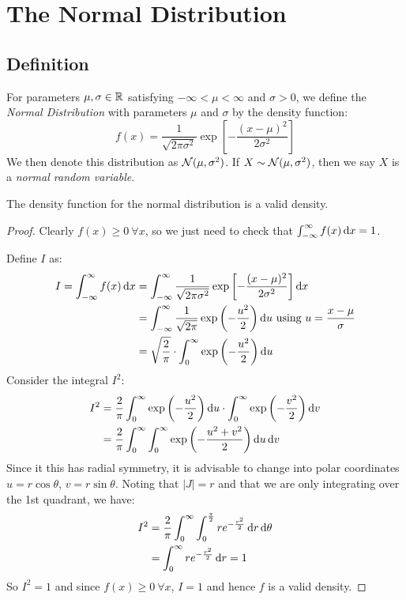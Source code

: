\documentclass[../main.tex]{subfiles}
\begin{document}
\section{The Normal Distribution}
\subsection{Definition}
\begin{definition}
  For parameters $\mu, \sigma \in \mathbb{R}$ satisfying $-\infty < \mu < \infty$ and $\sigma > 0$, we define the \textit{Normal Distribution} with parameters $\mu$ and $\sigma$ by the density function: \label{normalDist}
  \[
    f(x) = \frac{1}{\sqrt{2\pi \sigma^2}}\exp\left[- \frac{(x - \mu)^2}{2 \sigma^2}\right]
  \]
  We then denote this distribution as $\operatorname{\mathcal{N}}(\mu, \sigma^2)$.
  If $X \sim \operatorname{\mathcal{N}}(\mu, \sigma^2)$, then we say $X$ is a \textit{normal random variable}.
\end{definition}
\begin{lemma}
  The density function for the normal distribution is a valid density. \label{normalDensity}
\end{lemma}
\begin{proof}
  Clearly $f(x) \geq 0\ \forall x$, so we just need to check that $\int_{-\infty}^{\infty} f(x) \d{x} = 1$.

  Define $I$ as:
  \begin{align*}
    I = \int_{-\infty}^{\infty} f(x) \d{x} &= \int_{-\infty}^{\infty} \frac{1}{\sqrt{2\pi \sigma^2}}\exp\left[- \frac{(x - \mu)^2}{2 \sigma^2}\right] \d{x} \\
                                       &= \int_{-\infty}^{\infty} \frac{1}{\sqrt{2\pi}} \exp\left(-\frac{u^2}{2}\right) \d{u} \text{ using $u = \frac{x - \mu}{\sigma}$}\\
                                       &= \sqrt{\frac{2}{\pi}} \cdot \int_{0}^{\infty} \exp\left(-\frac{u^2}{2}\right) \d{u}
  \end{align*}
  Consider the integral $I^2$:
  \begin{align*}
    I^2 &= \frac{2}{\pi} \int_{0}^{\infty} \exp\left(-\frac{u^2}{2}\right) \d{u} \cdot \int_{0}^{\infty} \exp\left(-\frac{v^2}{2}\right) \d{v} \\
        &= \frac{2}{\pi} \int_{0}^{\infty} \int_{0}^{\infty} \exp\left(-\frac{u^2 + v^2}{2}\right) \d{u} \d{v}
  \end{align*}
  Since it this has radial symmetry, it is advisable to change into polar coordinates $u = r \cos \theta$, $v = r \sin \theta$.
  Noting that $|J| = r$ and that we are only integrating over the 1st quadrant, we have:
  \begin{align*}
    I^2 &= \frac{2}{\pi} \int_{0}^{\infty} \int_{0}^{\frac{\pi}{2}} r e^{-\frac{r^2}{2}} \d{r} \d{\theta} \\
        &= \int_{0}^{\infty} r e^{-\frac{r^2}{2}} \d{r} = 1
  \end{align*}
  So $I^2 = 1$ and since $f(x) \geq 0\ \forall x$, $I = 1$ and hence $f$ is a valid density.
\end{proof}
\end{document}
